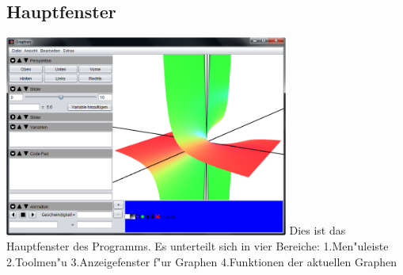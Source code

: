 \documentclass{scrartcl}
\begin{document}
\subsection{Hauptfenster}
\includegraphics[width=0.7\textwidth]{images/program/main-window.png}\newline
Dies ist das Hauptfenster des Programms. Es unterteilt sich in vier Bereiche:\newline
1.Men"uleiste\newline
2.Toolmen"u\newline
3.Anzeigefenster f"ur Graphen\newline
4.Funktionen der aktuellen Graphen
\end{document}
